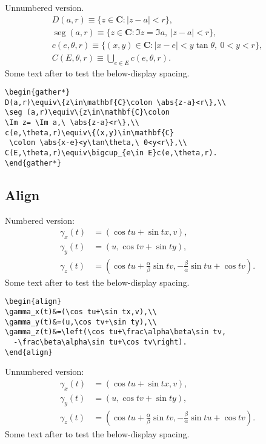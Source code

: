 \documentclass[mlq,fleqn]{w-art}
\DeclareMathOperator{\seg}{seg}
\newcommand{\envert}[1]{\left\lvert#1\right\rvert}
\let\abs=\envert
\begin{document}
Unnumbered version.
\begin{gather*}
D(a,r)\equiv\{z\in\mathbf{C}\colon \abs{z-a}<r\},\\
\seg (a,r)\equiv\{z\in\mathbf{C}\colon
\Im z= \Im a,\ \abs{z-a}<r\},\\
c(e,\theta,r)\equiv\{(x,y)\in\mathbf{C}
 \colon \abs{x-e}<y\tan\theta,\ 0<y<r\},\\
C(E,\theta,r)\equiv\bigcup_{e\in E}c(e,\theta,r).
\end{gather*}
Some text after to test the below-display spacing.
\begin{verbatim}
\begin{gather*}
D(a,r)\equiv\{z\in\mathbf{C}\colon \abs{z-a}<r\},\\
\seg (a,r)\equiv\{z\in\mathbf{C}\colon
\Im z= \Im a,\ \abs{z-a}<r\},\\
c(e,\theta,r)\equiv\{(x,y)\in\mathbf{C}
 \colon \abs{x-e}<y\tan\theta,\ 0<y<r\},\\
C(E,\theta,r)\equiv\bigcup_{e\in E}c(e,\theta,r).
\end{gather*}
\end{verbatim}

\newpage
\subsection{Align}
Numbered version:
\begin{align}
\gamma_x(t)&=(\cos tu+\sin tx,v),\\
\gamma_y(t)&=(u,\cos tv+\sin ty),\\
\gamma_z(t)&=\left(\cos tu+\frac\alpha\beta\sin tv,
  -\frac\beta\alpha\sin tu+\cos tv\right).
\end{align}
Some text after to test the below-display spacing.

\begin{verbatim}
\begin{align}
\gamma_x(t)&=(\cos tu+\sin tx,v),\\
\gamma_y(t)&=(u,\cos tv+\sin ty),\\
\gamma_z(t)&=\left(\cos tu+\frac\alpha\beta\sin tv,
  -\frac\beta\alpha\sin tu+\cos tv\right).
\end{align}
\end{verbatim}

Unnumbered version:
\begin{align*}
\gamma_x(t)&=(\cos tu+\sin tx,v),\\
\gamma_y(t)&=(u,\cos tv+\sin ty),\\
\gamma_z(t)&=\left(\cos tu+\frac\alpha\beta\sin tv,
  -\frac\beta\alpha\sin tu+\cos tv\right).
\end{align*}
Some text after to test the below-display spacing.
\end{document}
